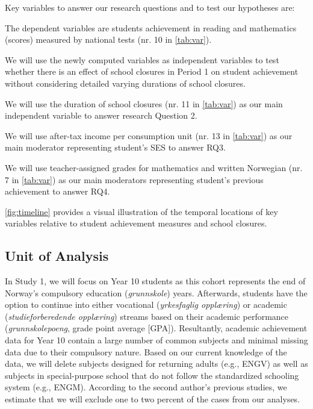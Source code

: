 Key variables to answer our research questions and to test our hypotheses are:
\begin{APAenumerate}
    \item The dependent variables are students achievement in reading and mathematics (scores) measured by national tests (nr. 10 in \cref{tab:var}).
    \item We will use the newly computed variables  as independent variables to test whether there is an effect of school closures in Period 1 on student achievement without considering detailed varying durations of school closures.
    \item We will use the duration of school closures (nr. 11 in \cref{tab:var}) as our main independent variable to answer research Question 2.
    \item We will use after-tax income per consumption unit (nr. 13 in \cref{tab:var}) as our main moderator representing student's SES to answer RQ3.
    \item We will use teacher-assigned grades for mathematics and written Norwegian (nr. 7 in \cref{tab:var}) as our main moderators representing student's previous achievement to answer RQ4.
\end{APAenumerate}

\cref{fig:timeline} provides a visual illustration of the temporal locations of key variables relative to student achievement measures and school closures.

\subsection{Unit of Analysis}
In Study 1, we will focus on Year 10 students as this cohort represents the end of Norway's compulsory education (\textit{grunnskole}) years. Afterwards, students have the option to continue into either vocational (\textit{yrkesfaglig oppl{\ae}ring}) or academic (\textit{studieforberedende oppl{\ae}ring}) streams based on their academic performance (\textit{grunnskolepoeng}, grade point average [GPA]). Resultantly, academic achievement data for Year 10 contain a large number of common subjects and minimal missing data due to their compulsory nature. Based on our current knowledge of the data, we will delete subjects designed for returning adults (e.g., ENGV) as well as subjects in special-purpose school that do not follow the standardized schooling system (e.g., ENGM). According to the second author's previous studies, we estimate that we will exclude one to two percent of the cases from our analyses.

